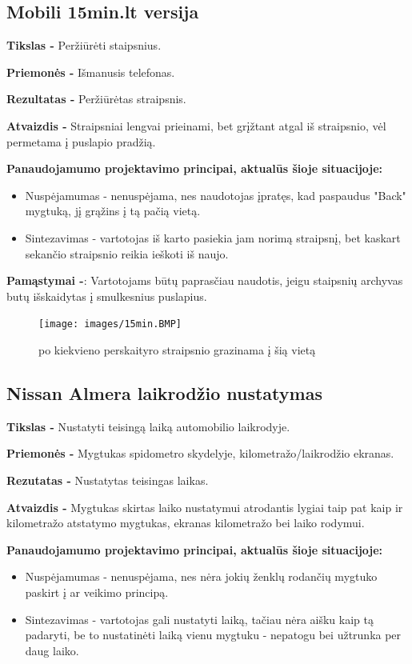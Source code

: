 ﻿\documentclass[a4paper, 12pt]{article}
\begin{document}
	\subsection{Mobili 15min.lt versija}	
		\textbf{Tikslas -}
		Peržiūrėti staipsnius.

		\textbf{Priemonės -}
		Išmanusis telefonas.

		\textbf{Rezultatas -}
		Peržiūrėtas straipsnis.

		\textbf{Atvaizdis -}
		Straipsniai lengvai prieinami, bet grįžtant atgal iš straipsnio, vėl permetama į puslapio pradžią.
		
		\textbf{Panaudojamumo projektavimo principai, aktualūs šioje situacijoje:}
		\begin{itemize}
		\item Nuspėjamumas - nenuspėjama, nes naudotojas įpratęs, kad paspaudus "Back" mygtuką, jį grąžins į tą pačią vietą.
		\item Sintezavimas - vartotojas iš karto pasiekia jam norimą straipsnį, bet kaskart sekančio straipsnio reikia ieškoti iš naujo.	
		\end{itemize}

		\textbf{Pamąstymai -}:
		Vartotojams būtų paprasčiau naudotis, jeigu staipsnių archyvas butų išskaidytas į smulkesnius puslapius.
		\begin{figure}[h]
		\centering
		\texttt{[image: images/15min.BMP]}
		\caption{po kiekvieno perskaityro straipsnio grazinama į šią vietą}
		\label{overflow}
		\end{figure}
	\subsection{Nissan Almera laikrodžio nustatymas}
		\textbf{Tikslas -}
		Nustatyti teisingą laiką automobilio laikrodyje.

		\textbf{Priemonės -}
		Mygtukas spidometro skydelyje, kilometražo/laikrodžio ekranas.

		\textbf{Rezutatas -}
		Nustatytas teisingas laikas.

		\textbf{Atvaizdis -}
		Mygtukas skirtas laiko nustatymui atrodantis lygiai taip pat kaip ir kilometražo atstatymo mygtukas,
		ekranas kilometražo bei laiko rodymui.
		
		\textbf{Panaudojamumo projektavimo principai, aktualūs šioje situacijoje:}
		\begin{itemize}
		\item Nuspėjamumas - nenuspėjama, nes nėra jokių ženklų rodančių mygtuko paskirt į ar veikimo principą.
		\item Sintezavimas - vartotojas gali nustatyti laiką, tačiau nėra aišku kaip tą padaryti, be
		to nustatinėti laiką vienu mygtuku - nepatogu bei užtrunka per daug laiko.
		\end{itemize}
\end{document}
